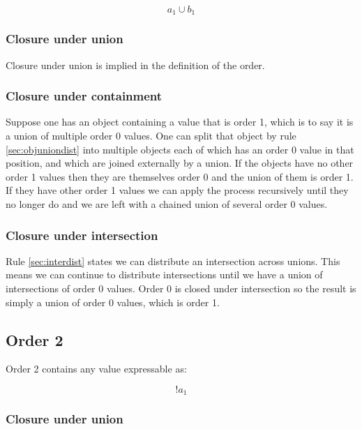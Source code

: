 \documentclass[letterpaper]{article}
\begin{document}
\begin{equation}
a_1 \cup b_1
\end{equation}

\subsubsection{Closure under union}

Closure under union is implied in the definition of the order.

\subsubsection{Closure under containment}

Suppose one has an object containing a value that is order 1, which is to say
it is a union of multiple order 0 values. One can split that object by rule
\ref{sec:objuniondist} into multiple objects each of which has an order 0 value in
that position, and which are joined externally by a union. If the objects have
no other order 1 values then they are themselves order 0 and the union of them is
order 1. If they have other order 1 values we can apply the process recursively
until they no longer do and we are left with a chained union of several order 0
values.

\subsubsection{Closure under intersection}

Rule \ref{sec:interdist} states we can distribute an intersection across
unions. This means we can continue to distribute intersections until
we have a union of intersections of order 0 values. Order 0 is closed under
intersection so the result is simply a union of order 0 values, which is order
1.

\subsection{Order 2}
Order 2 contains any value expressable as:

\begin{equation}
!a_1
\end{equation}

\subsubsection{Closure under union}
\end{document}
